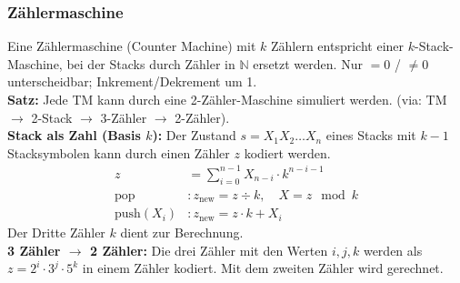 \subsubsection{Zählermaschine}
Eine Zählermaschine (Counter Machine) mit \(k\) Zählern entspricht einer \(k\)-Stack-Maschine, bei der Stacks durch Zähler in \(\mathbb{N}\) ersetzt werden. Nur \(= 0\) / \(\neq 0\) unterscheidbar; Inkrement/Dekrement um 1.\\
\textbf{Satz:} Jede TM kann durch eine 2-Zähler-Maschine simuliert werden. (via: TM \(\to\) 2-Stack \(\to\) 3-Zähler \(\to\) 2-Zähler).\\

\textbf{Stack als Zahl (Basis \(k\)):} Der Zustand \(s=X_1X_2\ldots X_n\) eines Stacks mit \(k-1\) Stacksymbolen kann durch einen Zähler \(z\) kodiert werden.
\begin{align*}
    z &= \sum_{i=0}^{n-1} X_{n-i} \cdot k^{n-i-1} \\
    \text{pop}&: z_{\text{new}} = z \div k, \quad X = z \mod k \\
    \text{push}(X_i)&: z_{\text{new}} = z \cdot k + X_i
\end{align*}
Der Dritte Zähler \(k\) dient zur Berechnung.\\

\textbf{3 Zähler \(\to\) 2 Zähler:} Die drei Zähler mit den Werten \(i,j,k\) werden als \(z = 2^i \cdot 3^j \cdot 5^k\) in einem Zähler kodiert. Mit dem zweiten Zähler wird gerechnet.

